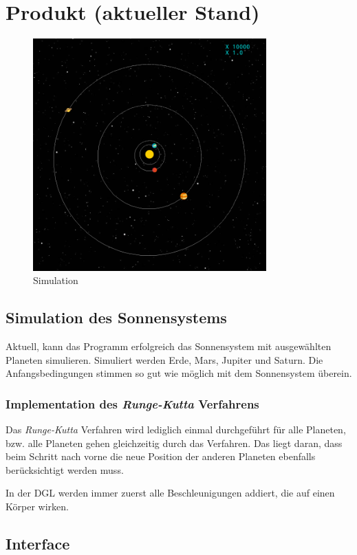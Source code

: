 \documentclass{article}
\begin{document}
\section{Produkt (aktueller Stand)}
\begin{figure}[hbt]
	\centering
		\includegraphics[width=0.8\textwidth]{game.png}
	\caption{Simulation}
	\label{img:simulation}
\end{figure}
\subsection{Simulation des Sonnensystems}
Aktuell, kann das Programm erfolgreich das Sonnensystem mit ausgewählten Planeten simulieren. Simuliert werden Erde, Mars, Jupiter und Saturn. Die Anfangsbedingungen stimmen so gut wie möglich mit dem Sonnensystem überein.
\subsubsection{Implementation des \textit{Runge-Kutta }Verfahrens}
Das \textit{Runge-Kutta} Verfahren wird lediglich einmal durchgeführt für alle Planeten, bzw. alle Planeten gehen gleichzeitig durch das Verfahren. Das liegt daran, dass beim Schritt nach vorne die neue Position der anderen Planeten ebenfalls berücksichtigt werden muss.

In der DGL werden immer zuerst alle Beschleunigungen addiert, die auf einen Körper wirken.
\subsection{Interface}
\end{document}
